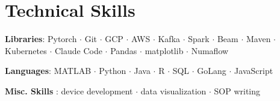%

                


    
      
\vspace{-3mm}


\section*{\textbf{Technical Skills}}
 \begin{itemize}[leftmargin=0.05in, label={}]
    \small{
 \item{\textbf{Libraries}{: Pytorch $\cdot$ Git $\cdot$ GCP $\cdot$ AWS $\cdot$ Kafka $\cdot$ Spark $\cdot$ Beam $\cdot$ Maven $\cdot$ Kubernetes $\cdot$ Claude Code $\cdot$ Pandas $\cdot$ matplotlib $\cdot$ Numaflow}}
 \item{ \textbf{Languages}: MATLAB $\cdot$ Python $\cdot$ Java $\cdot$ R $\cdot$ SQL $\cdot$ GoLang $\cdot$ JavaScript }
 \item{\textbf{Misc. Skills} : device development $\cdot$ data visualization $\cdot$ SOP writing}
    }
 \end{itemize}
 \vspace{-16pt}
% 
